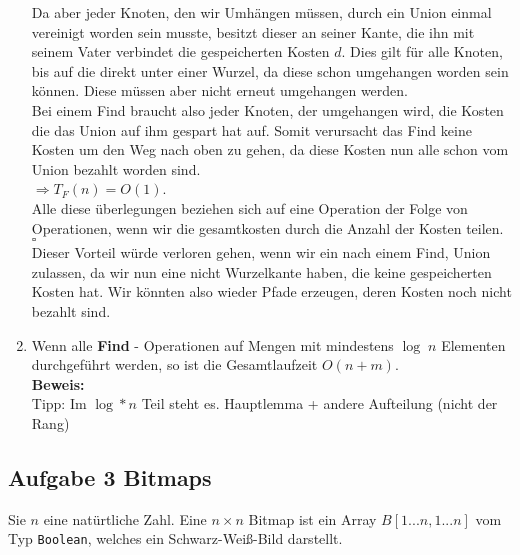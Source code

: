 \documentclass[11pt,a4paper,ngerman]{article}
\begin{document}
\begin{enumerate}[\bfseries (a)]
Da aber jeder Knoten, den wir Umhängen müssen, durch ein Union einmal vereinigt worden sein musste, besitzt dieser an seiner Kante, die ihn mit seinem Vater verbindet die gespeicherten Kosten $d$. Dies gilt für alle Knoten, bis auf die direkt unter einer Wurzel, da diese schon umgehangen worden sein können. Diese müssen aber nicht erneut umgehangen werden.\\

Bei einem Find braucht also jeder Knoten, der umgehangen wird, die Kosten die das Union auf ihm gespart hat auf. Somit verursacht das Find keine Kosten um den Weg nach oben zu gehen, da diese Kosten nun alle schon vom Union bezahlt worden sind.\\
$\Rightarrow T_F(n) = O(1)$.\\
Alle diese überlegungen beziehen sich auf eine Operation der Folge von Operationen, wenn wir die gesamtkosten durch die Anzahl der Kosten teilen.\\

\mbox{} \hfill $\square$\\

Dieser Vorteil würde verloren gehen, wenn wir ein nach einem Find, Union zulassen, da wir nun eine nicht Wurzelkante haben, die keine gespeicherten Kosten hat. Wir könnten also wieder Pfade erzeugen, deren Kosten noch nicht bezahlt sind.

\item Wenn alle \textbf{Find} - Operationen auf Mengen mit mindestens $\log \; n$ Elementen durchgeführt werden, so ist die Gesamtlaufzeit $O(n + m)$.\\

\textbf{Beweis:}\\

Tipp: Im $\log* n$ Teil steht es. Hauptlemma + andere Aufteilung (nicht der Rang)

\end{enumerate}

\subsection*{Aufgabe 3 \mdseries Bitmaps}

Sie $n$ eine natürtliche Zahl. Eine $ n \times n $ Bitmap ist ein Array $B[1 ... n, 1 ... n]$ vom Typ \texttt{Boolean}, welches ein Schwarz-Weiß-Bild darstellt.
\end{document}
